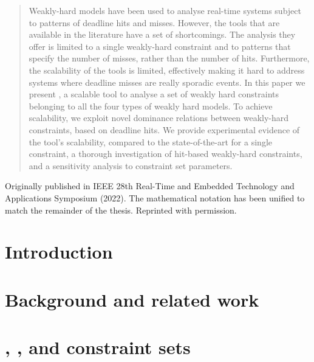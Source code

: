 \renewcommand\thisdir{papers/rtas22b}
\renewcommand\figdir{\thisdir/figs}




\begin{abstract}
    Weakly-hard models have been used to analyse real-time systems subject to patterns of deadline hits and misses.
    However, the tools that are available in the literature have a set of shortcomings.
    The analysis they offer is limited to a single weakly-hard constraint and to patterns that specify the number of misses, rather than the number of hits.
    Furthermore, the scalability of the tools is limited, effectively making it hard to address systems where deadline misses are really sporadic events.
    In this paper we present \tool{}, a scalable tool to analyse a set of weakly hard constraints belonging to all the four types of weakly hard models.
    To achieve scalability, we exploit novel dominance relations between weakly-hard constraints, based on deadline hits.
    We provide experimental evidence of the tool's scalability, compared to the state-of-the-art for a single constraint, a thorough investigation of hit-based weakly-hard constraints, and a sensitivity analysis to constraint set parameters.
\end{abstract}

\vfill
Originally published in IEEE 28th Real-Time and Embedded Technology and Applications Symposium (2022).
The mathematical notation has been unified to match the remainder of the thesis.
Reprinted with permission.
\newpage

\section{Introduction}
\label{sec:intro}


\section{Background and related work}
\label{sec:background}


\section{\tAH{}, \tRH{}, and constraint sets}
\label{sec:theorems}


